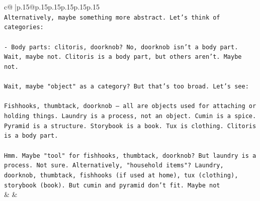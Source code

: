 \documentclass{article}
\begin{document}
{\begin{supertabular}{c@{$\;$}|p{.15\linewidth}@{}p{.15\linewidth}p{.15\linewidth}p{.15\linewidth}p{.15\linewidth}p{.15\linewidth}}
{{{\\ 
\texttt{Alternatively, maybe something more abstract. Let's think of categories:} \\
\\ 
\texttt{{-} Body parts: clitoris, doorknob? No, doorknob isn't a body part. Wait, maybe not. Clitoris is a body part, but others aren't. Maybe not.} \\
\\ 
\texttt{Wait, maybe "object" as a category? But that's too broad. Let's see:} \\
\\ 
\texttt{Fishhooks, thumbtack, doorknob – all are objects used for attaching or holding things. Laundry is a process, not an object. Cumin is a spice. Pyramid is a structure. Storybook is a book. Tux is clothing. Clitoris is a body part.} \\
\\ 
\texttt{Hmm. Maybe "tool" for fishhooks, thumbtack, doorknob? But laundry is a process. Not sure. Alternatively, "household items"? Laundry, doorknob, thumbtack, fishhooks (if used at home), tux (clothing), storybook (book). But cumin and pyramid don't fit. Maybe not} \\
            }
        }
    }
    & & \\ \\


\end{supertabular}}
\end{document}
